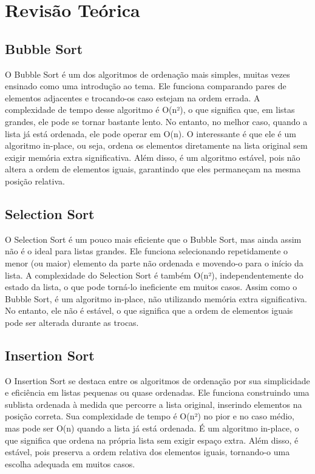 \documentclass[12pt, a4paper]{report}
\begin{document}
\chapter{Revisão Teórica}
\section{Bubble Sort}
O Bubble Sort é um dos algoritmos de ordenação mais simples, muitas vezes
ensinado como uma introdução ao tema. Ele funciona comparando pares de elementos
adjacentes e trocando-os caso estejam na ordem errada. A complexidade de tempo desse
algoritmo é O(n²), o que significa que, em listas grandes, ele pode se tornar bastante lento. No
entanto, no melhor caso, quando a lista já está ordenada, ele pode operar em O(n). O
interessante é que ele é um algoritmo in-place, ou seja, ordena os elementos diretamente na
lista original sem exigir memória extra significativa. Além disso, é um algoritmo estável, pois
não altera a ordem de elementos iguais, garantindo que eles permaneçam na mesma posição
relativa.

\section{Selection Sort}
O Selection Sort é um pouco mais eficiente que o Bubble Sort, mas ainda assim não é
o ideal para listas grandes. Ele funciona selecionando repetidamente o menor (ou maior)
elemento da parte não ordenada e movendo-o para o início da lista. A complexidade do
Selection Sort é também O(n²), independentemente do estado da lista, o que pode torná-lo
ineficiente em muitos casos. Assim como o Bubble Sort, é um algoritmo in-place, não
utilizando memória extra significativa. No entanto, ele não é estável, o que significa que a
ordem de elementos iguais pode ser alterada durante as trocas.

\section{Insertion Sort}
O Insertion Sort se destaca entre os algoritmos de ordenação por sua simplicidade e
eficiência em listas pequenas ou quase ordenadas. Ele funciona construindo uma sublista
ordenada à medida que percorre a lista original, inserindo elementos na posição correta. Sua
complexidade de tempo é O(n²) no pior e no caso médio, mas pode ser O(n) quando a lista já
está ordenada. É um algoritmo in-place, o que significa que ordena na própria lista sem exigir
espaço extra. Além disso, é estável, pois preserva a ordem relativa dos elementos iguais,
tornando-o uma escolha adequada em muitos casos.
\end{document}

